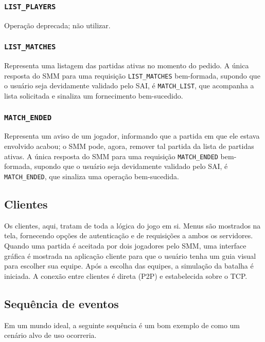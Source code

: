 \documentclass{article}
\begin{document}
\begin{multicols}{2}
    \subsubsection{\texttt{LIST\_PLAYERS}}
    
    Operação deprecada; não utilizar.
    
    \subsubsection{\texttt{LIST\_MATCHES}}
    
    Representa uma listagem das partidas ativas no momento do pedido. A única resposta do SMM para uma requisição \texttt{LIST\_MATCHES} bem-formada, supondo que o usuário seja devidamente validado pelo SAI, é \texttt{MATCH\_LIST}, que acompanha a lista solicitada e sinaliza um fornecimento bem-sucedido.
    
    \subsubsection{\texttt{MATCH\_ENDED}}
    
    Representa um aviso de um jogador, informando que a partida em que ele estava envolvido acabou; o SMM pode, agora, remover tal partida da lista de partidas ativas. A única resposta do SMM para uma requisição \texttt{MATCH\_ENDED} bem-formada, supondo que o usuário seja devidamente validado pelo SAI, é \texttt{MATCH\_ENDED}, que sinaliza uma operação bem-sucedida.
    
    \subsection{Clientes}
    
    Os clientes, aqui, tratam de toda a lógica do jogo em si. Menus são mostrados na tela, fornecendo opções de autenticação e de requisições a ambos os servidores. Quando uma partida é aceitada por dois jogadores pelo SMM, uma interface gráfica é mostrada na aplicação cliente para que o usuário tenha um guia visual para escolher sua equipe. Após a escolha das equipes, a simulação da batalha é iniciada. A conexão entre clientes é direta (P2P) e estabelecida sobre o TCP.
    
    \subsection{Sequência de eventos}
    
    Em um mundo ideal, a seguinte sequência é um bom exemplo de como um cenário alvo de uso ocorreria.
    

\end{multicols}
\end{document}
